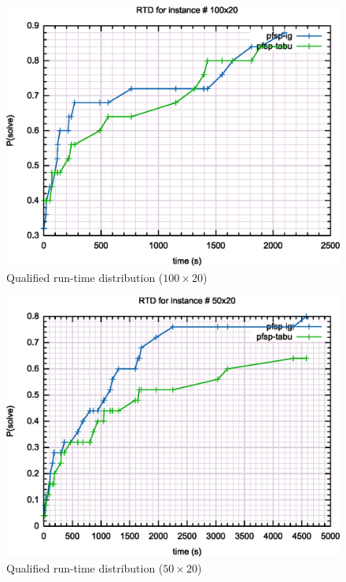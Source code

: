 

\begin{figure}[H]
	\centering
	\includegraphics[width=\textwidth]{fig/qrd/100x20}
	\caption{Qualified run-time distribution ($100 \times 20$)}
\end{figure}

\begin{figure}[H]
	\centering
	\includegraphics[width=\textwidth]{fig/qrd/50x20}
	\caption{Qualified run-time distribution ($50 \times 20$)}
\end{figure}

